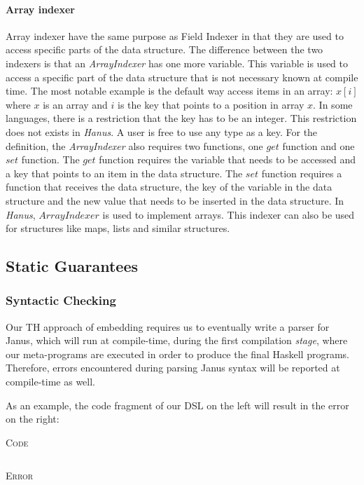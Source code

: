 \documentclass[12pt,a4paper]{article}
\newcommand{\code}[2]{
 \begin{center} \textsc{\small #1} \end{center}
 \inputminted[frame=lines,framesep=.5cm,baselinestretch=.8,linenos,fontsize=\footnotesize]
         {haskell}{code/#2.hs}
}
\newcommand{\codeErr}[1]{
 \begin{center} \textsc{\small Error} \end{center}
 \inputminted[frame=lines,framesep=.5cm,baselinestretch=.8,fontsize=\footnotesize]
         {bash}{code/#1_err.hs}
}
\begin{document}
    \paragraph{Array indexer}   
    Array indexer have the same purpose as Field Indexer in that they are used to access specific parts of the data structure. The difference between the two indexers is that an \textit{ArrayIndexer} has one more variable. This variable is used to access a specific part of the data structure that is not necessary known at compile time. The most notable example is the default way access items in an array: $x[i]$ where $x$ is an array and $i$ is the key that points to a position in array $x$. In some languages, there is a restriction that the key has to be an integer. This restriction does not exists in \textit{Hanus}. A user is free to use any type as a key. For the definition, the \textit{ArrayIndexer} also requires two functions, one $get$ function and one $set$ function. The $get$ function requires the variable that needs to be accessed and a key that points to an item in the data structure. The $set$ function requires a function that receives the data structure, the key of the variable in the data structure and the new value that needs to be inserted in the data structure. In \textit{Hanus}, $ArrayIndexer$ is used to implement arrays. This indexer can also be used for structures like maps, lists and similar structures.   

\subsection{Static Guarantees}

\subsubsection{Syntactic Checking}
Our TH approach of embedding requires us to eventually write a parser for Janus, which will run at compile-time, during the first compilation \textit{stage}, where our meta-programs are executed in order to produce the final Haskell programs. Therefore, errors encountered during parsing Janus syntax will be reported at compile-time as well.

As an example, the code fragment of our DSL on the left will result in the error on the right:

\hspace{1cm}
\begin{minipage}{.3\textwidth}
\code{Code}{syntax}
\end{minipage}
\hspace{1cm}
\begin{minipage}{.5\textwidth}
\codeErr{syntax}
\end{minipage}
\hspace{1cm}
\end{document}
